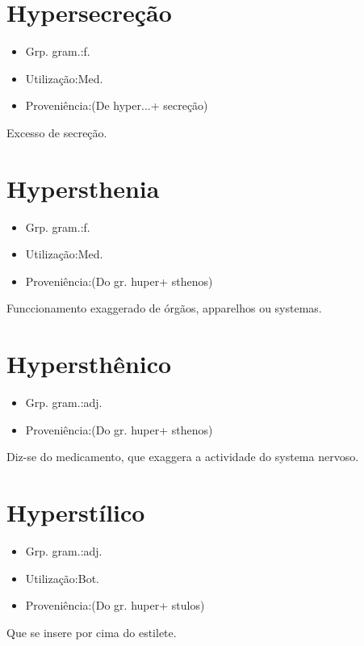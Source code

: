 \documentclass{article}
\begin{document}
\section{Hypersecreção}
\begin{itemize}
\item {Grp. gram.:f.}
\end{itemize}
\begin{itemize}
\item {Utilização:Med.}
\end{itemize}
\begin{itemize}
\item {Proveniência:(De \textunderscore hyper...\textunderscore  + \textunderscore secreção\textunderscore )}
\end{itemize}
Excesso de secreção.
\section{Hypersthenia}
\begin{itemize}
\item {Grp. gram.:f.}
\end{itemize}
\begin{itemize}
\item {Utilização:Med.}
\end{itemize}
\begin{itemize}
\item {Proveniência:(Do gr. \textunderscore huper\textunderscore  + \textunderscore sthenos\textunderscore )}
\end{itemize}
Funccionamento exaggerado de órgãos, apparelhos ou systemas.
\section{Hypersthênico}
\begin{itemize}
\item {Grp. gram.:adj.}
\end{itemize}
\begin{itemize}
\item {Proveniência:(Do gr. \textunderscore huper\textunderscore  + \textunderscore sthenos\textunderscore )}
\end{itemize}
Diz-se do medicamento, que exaggera a actividade do systema nervoso.
\section{Hyperstílico}
\begin{itemize}
\item {Grp. gram.:adj.}
\end{itemize}
\begin{itemize}
\item {Utilização:Bot.}
\end{itemize}
\begin{itemize}
\item {Proveniência:(Do gr. \textunderscore huper\textunderscore  + \textunderscore stulos\textunderscore )}
\end{itemize}
Que se insere por cima do estilete.
\end{document}
